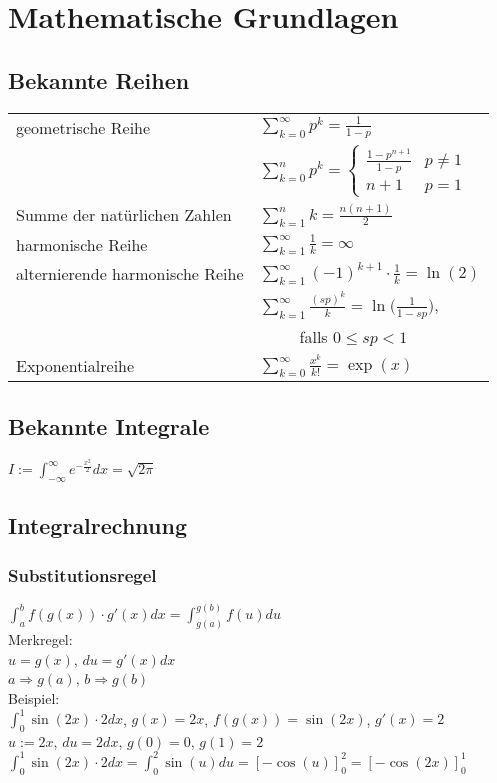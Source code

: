 \documentclass[a4paper,9pt]{extarticle}
\newcommand{\suminfty}[1][k = 1]{\sum_{#1}^{\infty}}
\newcommand{\intab}[1] {\int_{a}^{b} #1 dx}
\begin{document}
\newpage
\section*{Mathematische Grundlagen}
\subsection*{Bekannte Reihen}
\begin{tabular}{ll}
	geometrische Reihe & $\suminfty[k = 0] p^k = \frac{1}{1-p}$ \\
	& $\sum_{k = 0}^n{p^k} =
	\begin{cases}
		\frac{1 - p^{n + 1}}{1 - p} & p \neq 1 \\
		n + 1 & p = 1
	\end{cases}$ \\
	Summe der natürlichen Zahlen & $\sum_{k=1}^n k = \frac{n(n + 1)}{2}$ \\
	harmonische Reihe & $\suminfty{\frac{1}{k}} = \infty$ \\
	alternierende harmonische Reihe & $\suminfty{(-1)^{k + 1} ⋅ \frac{1}{k}} = \ln(2)$ \\
	& $\sum_{k = 1}^{∞} \frac{(sp)^k}{k} = \ln {\Big(\frac{1}{1 - sp}\Big)}$, \\
	& ~~~~~falls $0 ≤ sp < 1$ \\
	Exponentialreihe & $\suminfty[k = 0]{\frac{x^k}{k!}} = \exp(x)$
\end{tabular}

\subsection*{Bekannte Integrale}
$I := \int_{-∞}^∞ e^{-\frac{x^2}{2}} dx = \sqrt{2 \pi}$

\subsection*{Integralrechnung}
\subsubsection*{Substitutionsregel}
$\intab{f(g(x)) ⋅ g'(x)} = \int_{g(a)}^{g(b)} f(u) du$ \\

Merkregel: \\
$u = g(x)$, $du = g'(x) dx$ \\
$a \Rightarrow g(a)$, $b \Rightarrow g(b)$ \\

Beispiel: \\
$\int_0^1 \sin(2x) ⋅ 2 dx$, $g(x) = 2x$, $f(g(x)) = \sin(2x)$, $g'(x) = 2$ \\
$u:= 2x$, $du = 2 dx$, $g(0) = 0$, $g(1) = 2$ \\
$\int_0^1 \sin(2x) ⋅ 2 dx = \int_0^2 \sin(u) du = [-\cos(u)]_0^2 = [-\cos(2x)]_0^1$
\end{document}
